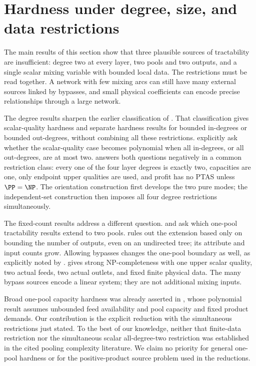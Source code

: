 \section{Hardness under degree, size, and data restrictions}\label{s3:hardness}

The main results of this section show that three plausible sources of
tractability are insufficient: degree two at every layer, two pools and
two outputs, and a single scalar mixing variable with bounded local data.
The restrictions must be read together. A network with few mixing arcs
can still have many external sources linked by bypasses, and small
physical coefficients can encode precise relationships through a large
network.

The degree results sharpen the earlier classification of
\citet[Sections~4--6]{haugland2016-the-computational-complexity-of-the}.
That classification gives scalar-quality hardness and separate hardness
results for bounded in-degrees or bounded out-degrees, without combining
all these restrictions. \citet[author manuscript, Section~4, p.~8]{s4:boland2017}
explicitly ask whether the scalar-quality case becomes polynomial when
all in-degrees, or all out-degrees, are at most two.
 answers both questions negatively in a common
restriction class: every one of the four layer degrees is exactly two,
capacities are one, only endpoint upper qualities are used, and profit
has no PTAS unless $\PP=\NP$. The orientation construction first develops
the two pure modes; the independent-set construction then imposes all
four degree restrictions simultaneously.

The fixed-count results address a different question.
\citet[Section~6, p.~214]{haugland2016-the-computational-complexity-of-the}
and \citet[author manuscript, Section~4, p.~8]{s4:boland2017} ask which
one-pool tractability results extend to two pools.
 rules out the extension based only on bounding the
number of outputs, even on an undirected tree; its attribute and input
counts grow. Allowing bypasses changes the one-pool boundary as well,
as explicitly noted by
\citet[Section~4.5, p.~607]{s3:haugland-hendrix2016}.
 gives strong NP-completeness with one upper scalar
quality, two actual feeds, two actual outlets, and fixed finite physical
data. The many bypass sources encode a linear system; they are not
additional mixing inputs.

Broad one-pool capacity hardness was already asserted in
\citet[Remark~4.6]{s3:baltean2018}, whose polynomial result assumes
unbounded feed availability and pool capacity and fixed product demands.
Our contribution is the explicit reduction with the simultaneous
restrictions just stated. To the best of our knowledge, neither that
finite-data restriction nor the simultaneous scalar all-degree-two
restriction was established in the cited pooling complexity literature.
We claim no priority for general one-pool hardness or for the
positive-product source problem used in the reductions.

